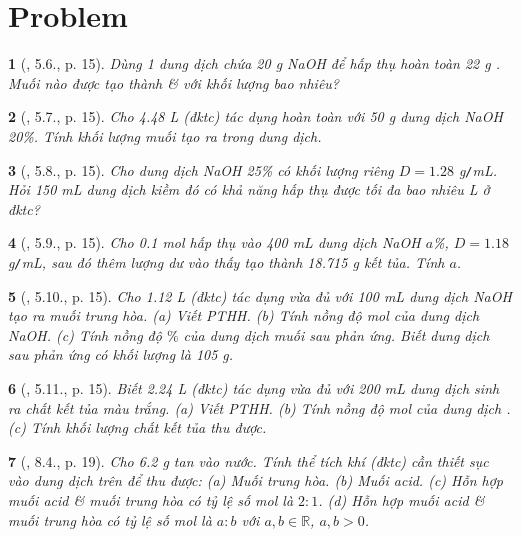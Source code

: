 \documentclass{article}
\newtheorem{baitoan}{}
\begin{document}
\section{Problem}

\begin{baitoan}[\cite{Truong_BTNC_Hoa_Hoc_9_2021}, 5.6., p. 15]
	Dùng 1 dung dịch chứa {\rm20 g NaOH} để hấp thụ hoàn toàn {\rm22 g }. Muối nào được tạo thành \& với khối lượng bao nhiêu?
\end{baitoan}

\begin{baitoan}[\cite{Truong_BTNC_Hoa_Hoc_9_2021}, 5.7., p. 15]
	Cho {\rm4.48 L } (đktc) tác dụng hoàn toàn với {\rm50 g} dung dịch {\rm NaOH 20\%}. Tính khối lượng muối tạo ra trong dung dịch.
\end{baitoan}

\begin{baitoan}[\cite{Truong_BTNC_Hoa_Hoc_9_2021}, 5.8., p. 15]
	Cho dung dịch {\rm NaOH 25\%} có khối lượng riêng $D = 1.28$ {\rm g{\tt/}mL}. Hỏi {\rm150 mL} dung dịch kiềm đó có khả năng hấp thụ được tối đa bao nhiêu {\rm L } ở đktc?
\end{baitoan}

\begin{baitoan}[\cite{Truong_BTNC_Hoa_Hoc_9_2021}, 5.9., p. 15]
	Cho {\rm0.1 mol } hấp thụ vào {\rm400 mL} dung dịch {\rm NaOH $a$\%}, $D = 1.18$ {\rm g{\tt/}mL}, sau đó thêm lượng dư {\rm{}} vào thấy tạo thành {\rm18.715 g} kết tủa. Tính $a$.
\end{baitoan}

\begin{baitoan}[\cite{Truong_BTNC_Hoa_Hoc_9_2021}, 5.10., p. 15]
	Cho {\rm1.12 L } (đktc) tác dụng vừa đủ với {\rm100 mL} dung dịch {\rm NaOH} tạo ra muối trung hòa. (a) Viết {\rm PTHH}. (b) Tính nồng độ mol của dung dịch {\rm NaOH}. (c) Tính nồng độ $\%$ của dung dịch muối sau phản ứng. Biết dung dịch sau phản ứng có khối lượng là {\rm105 g}.
\end{baitoan}

\begin{baitoan}[\cite{Truong_BTNC_Hoa_Hoc_9_2021}, 5.11., p. 15]
	Biết {\rm2.24 L } (đktc) tác dụng vừa đủ với {\rm200 mL} dung dịch {\rm{}} sinh ra chất kết tủa màu trắng. (a) Viết {\rm PTHH}. (b) Tính nồng độ mol của dung dịch {\rm{}}. (c) Tính khối lượng chất kết tủa thu được.
\end{baitoan}

\begin{baitoan}[\cite{Truong_BTNC_Hoa_Hoc_9_2021}, 8.4., p. 19]
	Cho {\rm6.2 g } tan vào nước. Tính thể tích khí {\rm{}} (đktc) cần thiết sục vào dung dịch trên để thu được: (a) Muối trung hòa. (b) Muối acid. (c) Hỗn hợp muối acid \& muối trung hòa có tỷ lệ số mol là $2:1$. (d) Hỗn hợp muối acid \& muối trung hòa có tỷ lệ số mol là $a:b$ với $a,b\in\mathbb{R}$, $a,b > 0$.
\end{baitoan}
\end{document}
